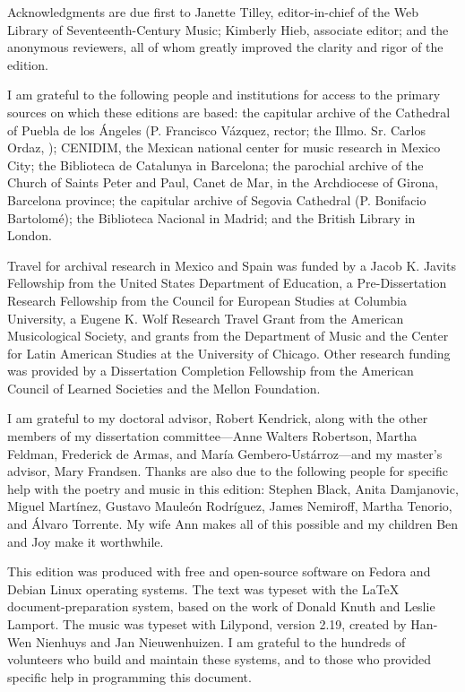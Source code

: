 Acknowledgments are due first to Janette Tilley, editor-in-chief of the Web
Library of Seventeenth-Century Music; Kimberly Hieb, associate editor; and the
anonymous reviewers, all of whom greatly improved the clarity and rigor of the
edition.

I am grateful to the following people and institutions for access to the 
primary sources on which these editions are based: 
the capitular archive of the Cathedral of Puebla de los Ángeles (P. Francisco 
Vázquez, rector; the Illmo. Sr. Carlos Ordaz, );
CENIDIM, the Mexican national center for music research in Mexico City;
the Biblioteca de Catalunya in Barcelona;
the parochial archive of the Church of Saints Peter and Paul, Canet de Mar, in 
the Archdiocese of Girona, Barcelona province;
the capitular archive of Segovia Cathedral (P. Bonifacio Bartolomé);
the Biblioteca Nacional in Madrid; and
the British Library in London.

Travel for archival research in Mexico and Spain was funded by 
a Jacob K. Javits Fellowship from the United States Department of Education, 
a Pre-Dissertation Research Fellowship from the Council for European Studies at 
Columbia University, 
a Eugene K. Wolf Research Travel Grant from the American Musicological Society, 
and grants from the Department of Music and the Center for Latin American 
Studies at the University of Chicago.
Other research funding was provided by a Dissertation Completion Fellowship 
from the American Council of Learned Societies and the Mellon Foundation.

I am grateful to my doctoral advisor, Robert Kendrick, along with the other
members of my dissertation committee---Anne Walters Robertson, Martha Feldman,
Frederick de Armas, and María Gembero-Ustárroz---and my master's advisor, Mary
Frandsen.
Thanks are also due to the following people for specific help with the poetry 
and music in this edition:
Stephen Black,
Anita Damjanovic, 
Miguel Martínez, 
Gustavo Mauleón Rodríguez,
James Nemiroff, 
Martha Tenorio,
and Álvaro Torrente.
My wife Ann makes all of this possible and my children Ben and Joy make it
worthwhile.


This edition was produced with free and open-source software on Fedora and
Debian Linux operating systems.
The text was typeset with the \LaTeX{} document-preparation system, based on 
the work of Donald Knuth and Leslie Lamport.
The music was typeset with Lilypond, version 2.19, created by Han-Wen Nienhuys
and Jan Nieuwenhuizen.
I am grateful to the hundreds of volunteers who build and maintain these 
systems, and to those who provided specific help in programming this document.


